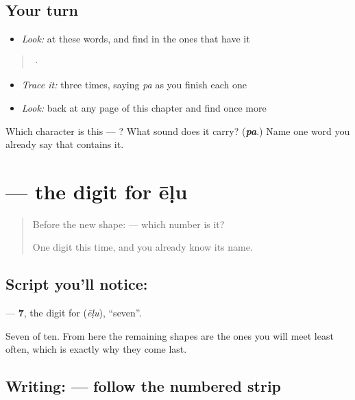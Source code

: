 \subsection*{Your turn}
\begin{itemize}
\raggedright
  \item \emph{Look:} at these words, and find  in the ones that have it
\end{itemize}

\begin{quote}
  ·  
\end{quote}

\begin{itemize}
\raggedright
  \item \emph{Trace it:}  three times, saying \emph{pa} as you finish each one
  \item \emph{Look:} back at any page of this chapter and find  once more
\end{itemize}

\begin{tcolorbox}[breakable,colback=teal!4,colframe=teal!35!black,title={Before you move on}]
Which character is this — ? What sound does it carry? (\emph{\textbf{pa}}.) Name one word you already say that contains it.
\end{tcolorbox}
\section[\texorpdfstring{\kn{೭} (7)}{೭ (7)}]{ — the digit for ēḷu}

\label{lesson:KA-S146-digit-seven}



\begin{quote}
Before the new shape: \textbf{} — which number is it?

One digit this time, and you already know its name.
\end{quote}

\subsection*{Script you'll notice: }
\textbf{} — \textbf{7}, the digit for \textbf{} (\emph{ēḷu}), \textquotedblleft{}seven\textquotedblright{}.

Seven of ten. From here the remaining shapes are the ones you will meet least often, which is exactly why they come last.

\subsection*{Writing:  — follow the numbered strip}

